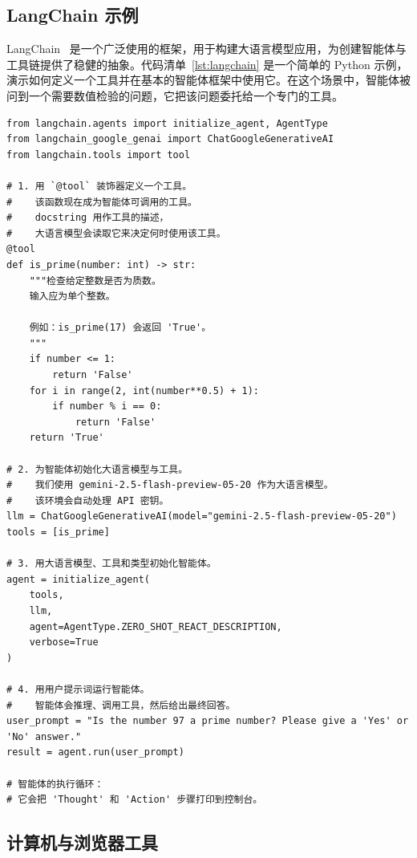 \subsection{LangChain 示例}
LangChain~\citep{Chase_LangChain_2022} 是一个广泛使用的框架，用于构建大语言模型应用，为创建智能体与工具链提供了稳健的抽象。代码清单~\ref{lst:langchain} 是一个简单的 Python 示例，演示如何定义一个工具并在基本的智能体框架中使用它。在这个场景中，智能体被问到一个需要数值检验的问题，它把该问题委托给一个专门的工具。
\begin{listing}
\begin{verbatim}
from langchain.agents import initialize_agent, AgentType
from langchain_google_genai import ChatGoogleGenerativeAI
from langchain.tools import tool

# 1. 用 `@tool` 装饰器定义一个工具。
#    该函数现在成为智能体可调用的工具。
#    docstring 用作工具的描述，
#    大语言模型会读取它来决定何时使用该工具。
@tool
def is_prime(number: int) -> str:
    """检查给定整数是否为质数。
    输入应为单个整数。

    例如：is_prime(17) 会返回 'True'。
    """
    if number <= 1:
        return 'False'
    for i in range(2, int(number**0.5) + 1):
        if number % i == 0:
            return 'False'
    return 'True'

# 2. 为智能体初始化大语言模型与工具。
#    我们使用 gemini-2.5-flash-preview-05-20 作为大语言模型。
#    该环境会自动处理 API 密钥。
llm = ChatGoogleGenerativeAI(model="gemini-2.5-flash-preview-05-20")
tools = [is_prime]

# 3. 用大语言模型、工具和类型初始化智能体。
agent = initialize_agent(
    tools,
    llm,
    agent=AgentType.ZERO_SHOT_REACT_DESCRIPTION,
    verbose=True
)

# 4. 用用户提示词运行智能体。
#    智能体会推理、调用工具，然后给出最终回答。
user_prompt = "Is the number 97 a prime number? Please give a 'Yes' or 'No' answer."
result = agent.run(user_prompt)

# 智能体的执行循环：
# 它会把 'Thought' 和 'Action' 步骤打印到控制台。
\end{verbatim}
    \caption{使用 LangChain 定义工具并在智能体中使用的示例。}\label{lst:langchain}
\end{listing}


\subsection{计算机与浏览器工具}
\label{sec:computer_browser_tools}

